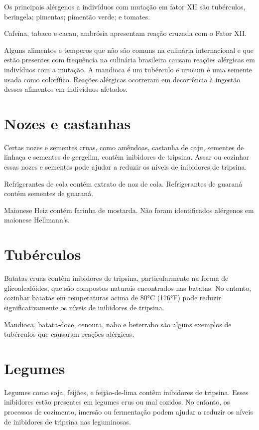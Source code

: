\documentclass{article}
\begin{document}
Os principais alérgenos a indivíduos com mutação em fator XII são tubérculos, beringela; pimentas; pimentão verde; e tomates.

Cafeína, tabaco e cacau, ambrósia apresentam reação cruzada com o Fator XII.

Alguns alimentos e temperos que não são comuns na culinária internacional e
que estão presentes com frequência na culinária brasileira causam reações
alérgicas em indivíduos com a mutação. A mandioca é um tubérculo e urucum
é uma semente usada como colorífico. Reações alérgicas ocorreram em decorrência
à ingestão desses alimentos em indivíduos afetados.

\section{Nozes e castanhas}

Certas nozes e sementes cruas, como amêndoas, castanha de caju, sementes de linhaça e sementes de gergelim, contêm inibidores de tripsina. Assar ou cozinhar essas nozes e sementes pode ajudar a reduzir os níveis de inibidores de tripsina.

Refrigerantes de cola contém extrato de noz de cola.
Refrigerantes de guaraná contém sementes de guaraná.

Maionese Heiz contém farinha de mostarda.
Não foram identificados alérgenos em maionese Hellmann's.

\section{Tubérculos}

Batatas cruas contêm inibidores de tripsina, particularmente na forma de glicoalcalóides, que são compostos naturais encontrados nas batatas. No entanto, cozinhar batatas em temperaturas acima de 80°C (176°F) pode reduzir significativamente os níveis de inibidores de tripsina.

Mandioca, batata-doce, cenoura, nabo e beterrabo são alguns exemplos de
tubérculos que causaram reações alérgicas.

\section{Legumes}

Legumes como soja, feijões, e feijão-de-lima contêm inibidores de tripsina.
Esses inibidores estão presentes em legumes crus ou mal cozidos.
No entanto, os processos de cozimento, imersão ou fermentação podem ajudar a reduzir os níveis de inibidores de tripsina nas leguminosas.
\end{document}
